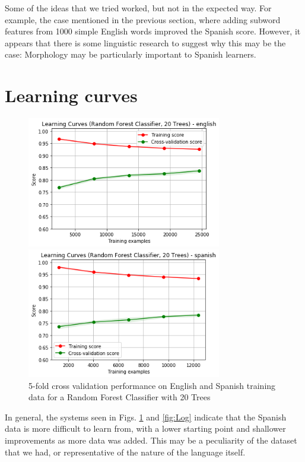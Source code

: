 \documentclass[11pt,a4paper]{article}
\begin{document}
Some of the ideas that we tried worked, but not in the expected way. For example, the case mentioned in the previous section, where adding subword features from 1000 simple English words improved the Spanish score. However, it appears that there is some linguistic research to suggest why this may be the case: Morphology may be particularly important to Spanish learners.

\section{Learning curves}

\begin{figure}[h]
\begin{minipage}[b]{1.0\linewidth}
  \centering
  \centerline{\includegraphics[width=8.5cm]{images/RFCEng}}
\end{minipage}
\begin{minipage}[b]{1.0\linewidth}
  \centering
  \centerline{\includegraphics[width=8.5cm]{images/RFCSp}}
\end{minipage}
\caption{5-fold cross validation performance on English and Spanish training data for a Random Forest Classifier with 20 Trees}
\label{fig:RFC}
\end{figure}

In general, the systems seen in Figs. \ref{fig:RFC} and \ref{fig:Log} indicate that the Spanish data is more difficult to learn from, with a lower starting point and shallower improvements as more data was added. This may be a peculiarity of the dataset that we had, or representative of the nature of the language itself.
\end{document}
